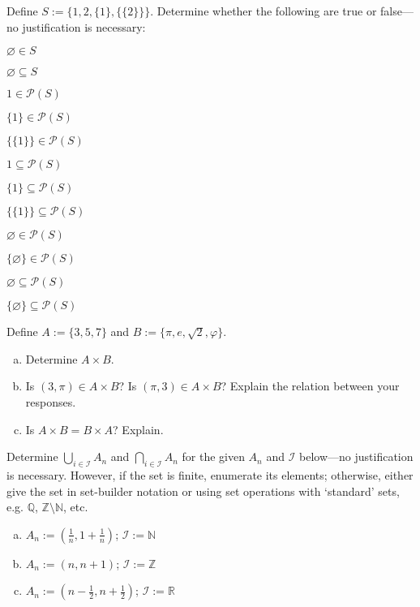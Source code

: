 \documentclass[11pt,letterpaper]{article}
\begin{document}
\newpage



 Define $S:= \{ 1, 2, \{ 1 \}, \{ \{ 2 \} \} \}$. Determine whether the following are true or false---no justification is necessary:
	\begin{2enumerate}
	\item $\varnothing \in S$
	\item $\varnothing \subseteq S$
	\item $1 \in \mathcal{P}(S)$
	\item $\{ 1 \} \in \mathcal{P}(S)$
	\item $\{ \{ 1 \} \} \in \mathcal{P}(S)$
	\item $1 \subseteq \mathcal{P}(S)$
	\item $\{ 1 \} \subseteq \mathcal{P}(S)$
	\item $\{ \{ 1 \} \} \subseteq \mathcal{P}(S)$
	\item $\varnothing \in \mathcal{P}(S)$
	\item $\{ \varnothing \} \in \mathcal{P}(S)$
	\item $\varnothing \subseteq \mathcal{P}(S)$
	\item $\{ \varnothing \} \subseteq \mathcal{P}(S)$
	\end{2enumerate}



\newpage



 Define $A:= \{ 3, 5, 7 \}$ and $B:= \{ \pi, e, \sqrt{2}, \varphi \}$. 
	\begin{enumerate}[(a)]
	\item Determine $A \times B$.
	\item Is $(3, \pi) \in A \times B$? Is $(\pi, 3) \in A \times B$? Explain the relation between your responses. 
	\item Is $A \times B= B \times A$? Explain. 
	\end{enumerate}



\newpage



 Determine $\displaystyle \bigcup_{i \in \mathcal{I}} A_n$ and $\displaystyle \bigcap_{i \in \mathcal{I}} A_n$ for the given $A_n$ and $\mathcal{I}$ below---no justification is necessary. However, if the set is finite, enumerate its elements; otherwise, either give the set in set-builder notation or using set operations with `standard' sets, e.g. $\mathbb{Q}$, $\mathbb{Z} \setminus \mathbb{N}$, etc. 
	\begin{enumerate}[(a)]
	\item $A_n:= \left( \frac{1}{n}, 1 + \frac{1}{n} \right)$; $\mathcal{I}:= \mathbb{N}$
	\item $A_n:= \left( n, n + 1 \right)$; $\mathcal{I}:= \mathbb{Z}$
	\item $A_n:= \left( n - \frac{1}{2}, n + \frac{1}{2} \right)$; $\mathcal{I}:= \mathbb{R}$
	\end{enumerate}
\end{document}
